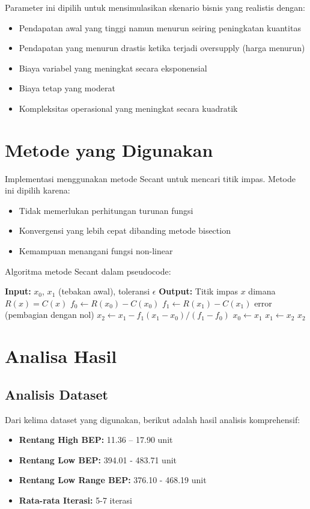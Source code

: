 \documentclass[conference]{IEEEtran}
\begin{document}
Parameter ini dipilih untuk mensimulasikan skenario bisnis yang realistis dengan:
\begin{itemize}
\item Pendapatan awal yang tinggi namun menurun seiring peningkatan kuantitas
\item Pendapatan yang menurun drastis ketika terjadi oversupply (harga menurun)
\item Biaya variabel yang meningkat secara eksponensial
\item Biaya tetap yang moderat
\item Kompleksitas operasional yang meningkat secara kuadratik
\end{itemize}

\section{Metode yang Digunakan}
Implementasi menggunakan metode Secant untuk mencari titik impas. Metode ini dipilih karena:
\begin{itemize}
\item Tidak memerlukan perhitungan turunan fungsi
\item Konvergensi yang lebih cepat dibanding metode bisection
\item Kemampuan menangani fungsi non-linear
\end{itemize}

Algoritma metode Secant dalam pseudocode:
\begin{algorithmic}
\STATE \textbf{Input:} $x_0$, $x_1$ (tebakan awal), toleransi $\epsilon$
\STATE \textbf{Output:} Titik impas $x$ dimana $R(x) = C(x)$
\REPEAT
    \STATE $f_0 \leftarrow R(x_0) - C(x_0)$
    \STATE $f_1 \leftarrow R(x_1) - C(x_1)$
        \RETURN error (pembagian dengan nol)
    \ENDIF
    \STATE $x_2 \leftarrow x_1 - f_1(x_1 - x_0)/(f_1 - f_0)$
    \STATE $x_0 \leftarrow x_1$
    \STATE $x_1 \leftarrow x_2$
\RETURN $x_2$
\end{algorithmic}

\section{Analisa Hasil}

\subsection{Analisis Dataset}
Dari kelima dataset yang digunakan, berikut adalah hasil analisis komprehensif:
\begin{itemize}
\item \textbf{Rentang High BEP:} 11.36 – 17.90 unit
\item \textbf{Rentang Low BEP:} 394.01 - 483.71 unit
\item \textbf{Rentang Low Range BEP:} 376.10 - 468.19 unit
\item \textbf{Rata-rata Iterasi:} 5-7 iterasi
\end{itemize}
\end{document}
